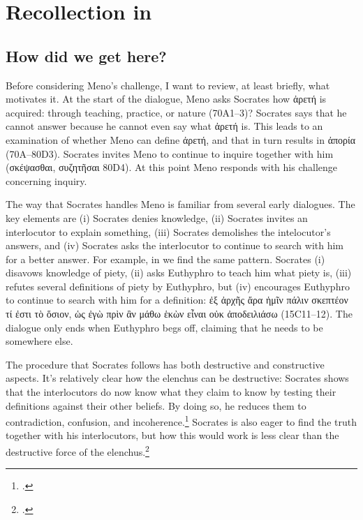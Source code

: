 
\section{Recollection in }

\subsection{How did we get here?}

Before considering Meno's challenge, I want to review, at least briefly, what motivates it. At the start of the dialogue, Meno asks Socrates how {\g ἀρετή} is acquired: through teaching, practice, or nature (70A1--3)? Socrates says that he cannot answer because he cannot even say what {\g ἀρετή} is. This leads to an examination of whether Meno can define {\g ἀρετή}, and that in turn results in {\g ἀπορία} (70A--80D3). Socrates invites Meno to continue to inquire together with him ({\g σκέψασθαι, συζητῆσαι} 80D4). At this point Meno responds with his challenge concerning inquiry.

The way that Socrates handles Meno is familiar from several early dialogues. The key elements are (i) Socrates denies knowledge, (ii) Socrates invites an interlocutor to explain something, (iii) Socrates demolishes the intelocutor's answers, and (iv) Socrates asks the interlocutor to continue to search with him for a better answer. For example, in  we find the same pattern. Socrates (i) disavows knowledge of piety, (ii) asks Euthyphro to teach him what piety is, (iii) refutes several definitions of piety by Euthyphro, but (iv) encourages Euthyphro to continue to search with him for a definition: {\g ἐξ ἀρχῆς ἄρα ἡμῖν πάλιν σκεπτέον τί ἐστι τὸ ὅσιον, ὡς ἐγὼ πρὶν ἂν μάθω ἑκὼν εἶναι οὐκ ἀποδειλιάσω} (15C11--12). The dialogue only ends when Euthyphro begs off, claiming that he needs to be somewhere else.

The procedure that Socrates follows has both destructive and constructive aspects. It's relatively clear how the elenchus can be destructive: Socrates shows that the interlocutors do now know what they claim to know by testing their definitions against their other beliefs. By doing so, he reduces them to contradiction, confusion, and incoherence.\footcite[As Gregory Vlastos has pointed out, however, there are problems about the details of the elenchus, even as a destructive technique. See Chapter 1 of][]{vlastos1991} Socrates is also eager to find the truth together with his interlocutors, but how this would work is less clear than the destructive force of the elenchus.\footcite[257]{gentzler1994}


